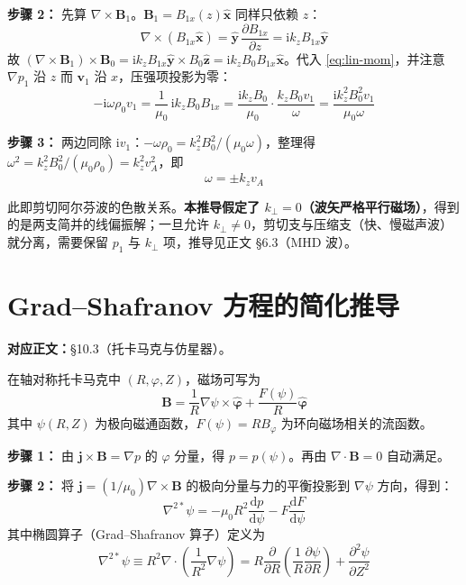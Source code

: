 \documentclass[12pt,a4paper,openany,oneside]{book}
\newcommand{\diff}{\mathrm{d}}
\newcommand{\ii}{\mathrm{i}}
\newcommand{\vect}[1]{\bm{#1}}
\newcommand{\unitvec}[1]{\hat{\vect{#1}}}
\newcommand{\grad}{\nabla}
\newcommand{\curl}{\nabla\times}
\newcommand{\divg}{\nabla\cdot}
\begin{document}
\textbf{步骤 2：} 先算 $\curl\vect{B}_1$。$\vect{B}_1=B_{1x}(z)\unitvec{x}$ 同样只依赖 $z$：
\[
\curl(B_{1x}\unitvec{x}) = \unitvec{y}\,\frac{\partial B_{1x}}{\partial z} = \ii k_z B_{1x}\unitvec{y}
\]
故 $(\curl\vect{B}_1)\times\vect{B}_0 = \ii k_z B_{1x}\unitvec{y}\times B_0\unitvec{z} = \ii k_z B_0 B_{1x}\unitvec{x}$。代入 \eqref{eq:lin-mom}，并注意 $\grad p_1$ 沿 $z$ 而 $\vect{v}_1$ 沿 $x$，压强项投影为零：
\begin{equation}
-\ii\omega\rho_0 v_1 = \frac{1}{\mu_0}\,\ii k_z B_0 B_{1x}
= \frac{\ii k_z B_0}{\mu_0}\cdot\frac{k_z B_0 v_1}{\omega}
= \frac{\ii k_z^2 B_0^2 v_1}{\mu_0\omega}
\label{eq:ch9-alfven-momentum}
\end{equation}

\textbf{步骤 3：} 两边同除 $\ii v_1$：$-\omega\rho_0 = k_z^2B_0^2/(\mu_0\omega)$，整理得 $\omega^2 = k_z^2 B_0^2/(\mu_0\rho_0) = k_z^2 v_A^2$，即
\begin{equation}
\boxed{\omega = \pm k_z v_A}
\label{eq:ch9-alfven-dispersion}
\end{equation}

此即剪切阿尔芬波的色散关系。\textbf{本推导假定了 $k_\perp=0$（波矢严格平行磁场）}，得到的是两支简并的线偏振解；一旦允许 $k_\perp\neq0$，剪切支与压缩支（快、慢磁声波）就分离，需要保留 $p_1$ 与 $k_\perp$ 项，推导见正文 \S 6.3（MHD 波）。


\section{Grad--Shafranov 方程的简化推导}
\label{sec:grad-shafranov}

\textbf{对应正文：}\S 10.3（托卡马克与仿星器）。

在轴对称托卡马克中 $(R,\varphi,Z)$，磁场可写为
\begin{equation}
\vect{B} = \frac{1}{R}\grad\psi\times\unitvec{\varphi} + \frac{F(\psi)}{R}\unitvec{\varphi}
\label{eq:ch10-grad-shafranov-b}
\end{equation}
其中 $\psi(R,Z)$ 为极向磁通函数，$F(\psi)=RB_\varphi$ 为环向磁场相关的流函数。

\textbf{步骤 1：} 由 $\vect{j}\times\vect{B}=\grad p$ 的 $\varphi$ 分量，得 $p=p(\psi)$。再由 $\divg\vect{B}=0$ 自动满足。

\textbf{步骤 2：} 将 $\vect{j}=(1/\mu_0)\curl\vect{B}$ 的极向分量与力的平衡投影到 $\grad\psi$ 方向，得到：
\begin{equation}
\nabla^{2*}\psi = -\mu_0 R^2 \frac{\diff p}{\diff\psi} - F\frac{\diff F}{\diff\psi}
\label{eq:ch10-grad-shafranov}
\end{equation}
其中椭圆算子（Grad--Shafranov 算子）定义为
\begin{equation}
\nabla^{2*}\psi \equiv R^2\divg\left(\frac{1}{R^2}\grad\psi\right) = R\frac{\partial }{\partial R}\!\left(\frac{1}{R}\frac{\partial \psi}{\partial R}\right) + \frac{\partial^2 \psi}{\partial Z^2}
\label{eq:ch10-grad-shafranov-operator}
\end{equation}
\end{document}

